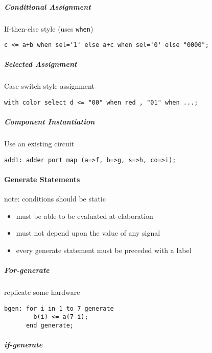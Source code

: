 \documentclass[
]{article}
\providecommand{\tightlist}{%
  \setlength{\itemsep}{0pt}\setlength{\parskip}{0pt}}
\begin{document}
\hypertarget{conditional-assignment}{%
\subparagraph{Conditional Assignment}\label{conditional-assignment}}

If-then-else style (uses \texttt{when})

\begin{verbatim}
c <= a+b when sel='1' else a+c when sel='0' else "0000";
\end{verbatim}

\hypertarget{selected-assignment}{%
\subparagraph{Selected Assignment}\label{selected-assignment}}

Case-switch style assignment

\begin{verbatim}
with color select d <= "00" when red , "01" when ...;
\end{verbatim}

\hypertarget{component-instantiation}{%
\subparagraph{Component Instantiation}\label{component-instantiation}}

Use an existing circuit

\begin{verbatim}
add1: adder port map (a=>f, b=>g, s=>h, co=>i);
\end{verbatim}

\hypertarget{generate-statements}{%
\paragraph{Generate Statements}\label{generate-statements}}

note: conditions should be static

\begin{itemize}
\tightlist
\item
  must be able to be evaluated at elaboration
\item
  must not depend upon the value of any signal
\item
  every generate statement must be preceded with a label
\end{itemize}

\hypertarget{for-generate}{%
\subparagraph{For-generate}\label{for-generate}}

replicate some hardware

\begin{verbatim}
bgen: for i in 1 to 7 generate 
        b(i) <= a(7-i); 
      end generate;
\end{verbatim}

\hypertarget{if-generate}{%
\subparagraph{if-generate}\label{if-generate}}
\end{document}
